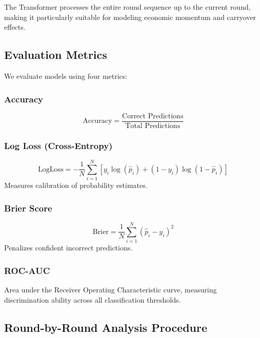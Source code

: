 \documentclass[11pt]{article}
\begin{document}
The Transformer processes the entire round sequence up to the current round, making it particularly suitable for modeling economic momentum and carryover effects.

\subsection{Evaluation Metrics}

We evaluate models using four metrics:

\subsubsection{Accuracy}
\begin{equation}
\text{Accuracy} = \frac{\text{Correct Predictions}}{\text{Total Predictions}}
\end{equation}

\subsubsection{Log Loss (Cross-Entropy)}
\begin{equation}
\text{LogLoss} = -\frac{1}{N} \sum_{i=1}^{N} [y_i \log(\hat{p}_i) + (1 - y_i) \log(1 - \hat{p}_i)]
\end{equation}
Measures calibration of probability estimates.

\subsubsection{Brier Score}
\begin{equation}
\text{Brier} = \frac{1}{N} \sum_{i=1}^{N} (\hat{p}_i - y_i)^2
\end{equation}
Penalizes confident incorrect predictions.

\subsubsection{ROC-AUC}

Area under the Receiver Operating Characteristic curve, measuring discrimination ability across all classification thresholds.

\subsection{Round-by-Round Analysis Procedure}
\end{document}
